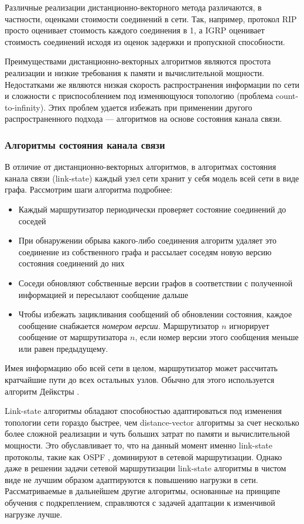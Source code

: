 \documentclass[specification,annotation,times]{itmo-student-thesis}
\theoremstyle{definition}
\begin{document}
Различные реализации дистанционно-векторного метода различаются, в частности,
оценками стоимости соединений в сети. Так, например, протокол RIP \cite{rip-rfc} просто
оценивает стоимость каждого соединения в 1, а IGRP \cite{igrp-patent} оценивает
стоимость соединений исходя из оценок задержки и пропускной способности.

Преимуществами дистанционно-векторных алгоритмов являются простота реализации и
низкие требования к памяти и вычислительной мощности. Недостатками же являются
низкая скорость распространения информации по сети и сложности с приспособлением
под изменяющуюся топологию (проблема count-to-infinity). Этих проблем
удается избежать при применении другого распространенного подхода --- алгоритмов
на основе состояния канала связи. 

\subsubsection{Алгоритмы состояния канала связи}

В отличие от дистанционно-векторных алгоритмов, в алгоритмах состояния канала связи
(link-state) каждый узел сети хранит у себя модель всей сети в виде графа.
Рассмотрим шаги алгоритма подробнее:

\begin{itemize}
\item Каждый маршрутизатор периодически проверяет состояние соединений до
  соседей
\item При обнаружении обрыва какого-либо соединения алгоритм удаляет это
  соединение из собственного графа и рассылает соседям новую версию состояния
  соединений до них
\item Соседи обновляют собственные версии графов в соответствии с полученной
  информацией и пересылают сообщение дальше
\item Чтобы избежать зацикливания сообщений об обновлении состояния, каждое
  сообщение снабжается \textit{номером версии}. Маршрутизатор $n$ игнорирует
  сообщение от маршрутизатора $n$, если номер версии этого сообщения меньше или
  равен предыдущему.
\end{itemize}

Имея информацию обо всей сети в целом, маршрутизатор может рассчитать кратчайшие
пути до всех остальных узлов. Обычно для этого используется алгоритм
Дейкстры \cite{dijkstra}. 

Link-state алгоритмы обладают способностью адаптироваться под изменения
топологии сети гораздо быстрее, чем distance-vector алгоритмы за счет
несколько более сложной реализации и чуть больших затрат по памяти и
вычислительной мощности. Это обуславливает то, что на данный момент именно
link-state протоколы, такие как OSPF \cite{ospf-rfc}, доминируют в сетевой
маршрутизации. Однако даже в решении задачи сетевой маршрутизации link-state
алгоритмы в чистом виде не лучшим образом адаптируются к повышению нагрузки в
сети. Рассматриваемые в дальнейшем другие алгоритмы, основанные на принципе
обучения с подкреплением, справляются с задачей адаптации к
изменчивой нагрузке лучше.
\end{document}
